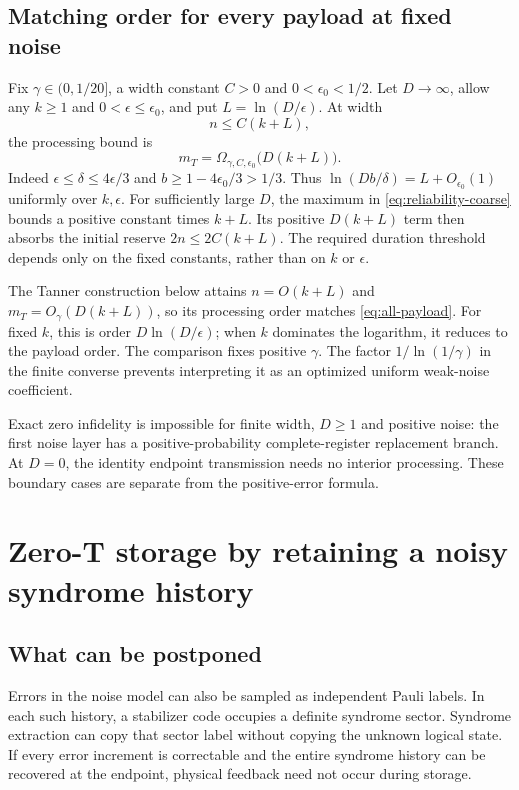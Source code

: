 \documentclass[11pt,a4paper]{article}
\numberwithin{equation}{section}
\theoremstyle{remark}\newtheorem*{remark}{Interpretation}
\newcommand{\eps}{\epsilon}
\begin{document}
\subsection{Matching order for every payload at fixed noise}
Fix $\gamma\in(0,1/20]$, a width constant $C>0$ and $0<\eps_0<1/2$. Let $D\to\infty$, allow any $k\ge1$ and $0<\eps\le\eps_0$, and put $L=\ln(D/\eps)$. At width
\begin{equation}
 n\le C(k+L),
\end{equation}
the processing bound is
\begin{equation}
 m_T=\Omega_{\gamma,C,\eps_0}\bigl(D(k+L)\bigr).
\label{eq:all-payload}
\end{equation}
Indeed $\eps\le\delta\le4\eps/3$ and $b\ge1-4\eps_0/3>1/3$. Thus $\ln(Db/\delta)=L+O_{\eps_0}(1)$ uniformly over $k,\eps$. For sufficiently large $D$, the maximum in \eqref{eq:reliability-coarse} bounds a positive constant times $k+L$. Its positive $D(k+L)$ term then absorbs the initial reserve $2n\le2C(k+L)$. The required duration threshold depends only on the fixed constants, rather than on $k$ or $\eps$.

The Tanner construction below attains $n=O(k+L)$ and $m_T=O_\gamma(D(k+L))$, so its processing order matches \eqref{eq:all-payload}. For fixed $k$, this is order $D\ln(D/\eps)$; when $k$ dominates the logarithm, it reduces to the payload order. The comparison fixes positive $\gamma$. The factor $1/\ln(1/\gamma)$ in the finite converse prevents interpreting it as an optimized uniform weak-noise coefficient.

Exact zero infidelity is impossible for finite width, $D\ge1$ and positive noise: the first noise layer has a positive-probability complete-register replacement branch. At $D=0$, the identity endpoint transmission needs no interior processing. These boundary cases are separate from the positive-error formula.

\section{Zero-T storage by retaining a noisy syndrome history}
\subsection{What can be postponed}
Errors in the noise model can also be sampled as independent Pauli labels. In each such history, a stabilizer code occupies a definite syndrome sector. Syndrome extraction can copy that sector label without copying the unknown logical state. If every error increment is correctable and the entire syndrome history can be recovered at the endpoint, physical feedback need not occur during storage.
\end{document}
